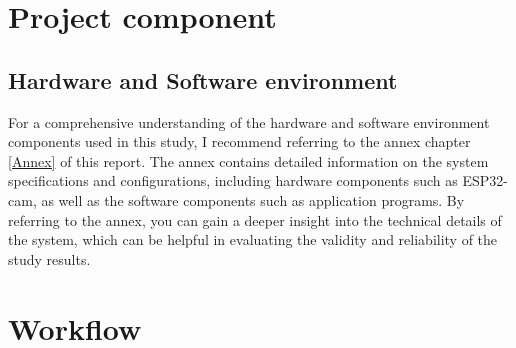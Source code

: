 \FloatBarrier




\section{Project component}
\subsection{Hardware and Software environment}
For a comprehensive understanding of the hardware and software environment components used in this study, I recommend referring to the annex chapter \ref{Annex} of this report. The annex contains detailed information on the system specifications and configurations, including hardware components such as ESP32-cam, as well as the software components such as  application programs. By referring to the annex, you can gain a deeper insight into the technical details of the system, which can be helpful in evaluating the validity and reliability of the study results.






\section{Workflow}

